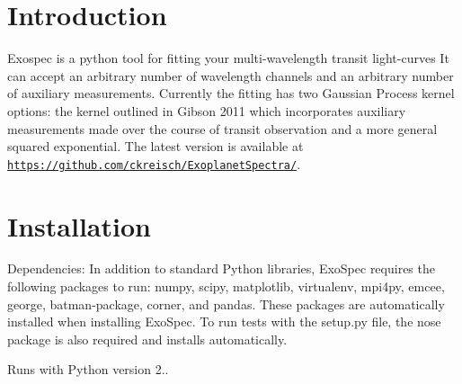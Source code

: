 \hypertarget{index_intro_sec}{}\section{Introduction}\label{index_intro_sec}
Exospec is a python tool for fitting your multi-\/wavelength transit light-\/curves It can accept an arbitrary number of wavelength channels and an arbitrary number of auxiliary measurements. Currently the fitting has two Gaussian Process kernel options\+: the kernel outlined in Gibson 2011 which incorporates auxiliary measurements made over the course of transit observation and a more general squared exponential. The latest version is available at \href{https://github.com/ckreisch/ExoplanetSpectra/}{\tt https\+://github.\+com/ckreisch/\+Exoplanet\+Spectra/}.\hypertarget{index_install_sec}{}\section{Installation}\label{index_install_sec}
Dependencies\+: In addition to standard Python libraries, Exo\+Spec requires the following packages to run\+: numpy, scipy, matplotlib, virtualenv, mpi4py, emcee, george, batman-\/package, corner, and pandas. These packages are automatically installed when installing Exo\+Spec. To run tests with the setup.\+py file, the nose package is also required and installs automatically.

Runs with Python version 2..


